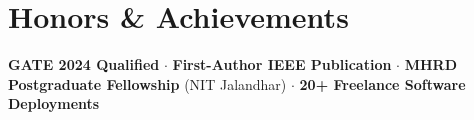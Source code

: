 \documentclass[10pt,a4paper]{article}
\begin{document}
\section*{Honors \& Achievements}
\noindent\small
\textbf{GATE 2024 Qualified} $\cdot$ \textbf{First-Author IEEE Publication} $\cdot$ \textbf{MHRD Postgraduate Fellowship} (NIT Jalandhar) $\cdot$ \textbf{20+ Freelance Software Deployments}
\end{document}
